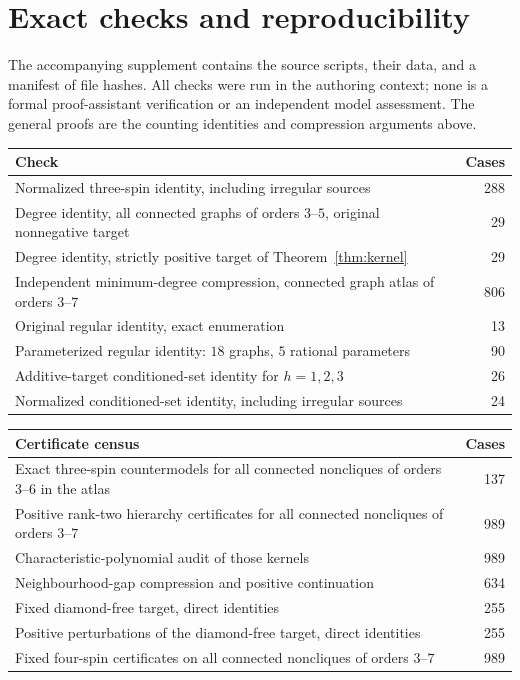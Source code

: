 \documentclass[11pt]{article}
\theoremstyle{remark}
\begin{document}
\section{Exact checks and reproducibility}
The accompanying supplement contains the source scripts, their data,
and a manifest of file hashes. All checks were run in the authoring
context; none is a formal proof-assistant verification or an
independent model assessment. The general proofs are the counting
identities and compression arguments above.

\begin{center}
\begin{tabular}{@{}p{9.0cm}r@{}}
\toprule
Check & Cases\\
\midrule
Normalized three-spin identity, including irregular sources &288\\
Degree identity, all connected graphs of orders $3$--$5$,
original nonnegative target & 29\\
Degree identity, strictly positive target of Theorem~\ref{thm:kernel}
&29\\
Independent minimum-degree compression,
connected graph atlas of orders $3$--$7$ &806\\
Original regular identity, exact enumeration &13\\
Parameterized regular identity: $18$ graphs, $5$ rational parameters
&90\\
Additive-target conditioned-set identity for $h=1,2,3$
&26\\
Normalized conditioned-set identity, including irregular sources &24\\
\bottomrule
\end{tabular}
\end{center}
\begin{center}
\begin{tabular}{@{}p{9.0cm}r@{}}
\toprule
Certificate census & Cases\\
\midrule
Exact three-spin countermodels for all connected noncliques
of orders $3$--$6$ in the atlas &137\\
Positive rank-two hierarchy certificates for all connected
noncliques of orders $3$--$7$ &989\\
Characteristic-polynomial audit of those kernels &989\\
Neighbourhood-gap compression and positive continuation &634\\
Fixed diamond-free target, direct identities &255\\
Positive perturbations of the diamond-free target, direct identities &255\\
Fixed four-spin certificates on all connected noncliques of orders $3$--$7$ &989\\
\bottomrule
\end{tabular}
\end{center}
\end{document}
